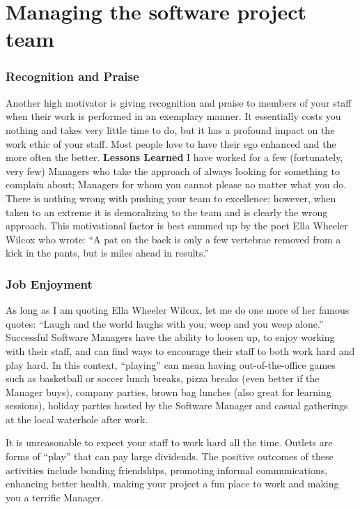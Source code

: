 \documentclass{book}
\begin{document}
\setcounter{chapter}{6}
\chapter{Managing the software project team}
\setcounter{section}{4}
\setcounter{subsection}{3}
\subsection{Recognition and Praise}

Another high motivator is giving recognition and praise to
members of your staff when their work is performed in an
exemplary manner. It essentially costs you nothing and takes
very little time to do, but it has a profound impact on the
work ethic of your staff. Most people love to have their ego
enhanced and the more often the better.
\textbf{Lessons Learned} I have worked for a few
(fortunately, very few) Managers who take
the approach of always looking for something
to complain about; Managers for whom you
cannot please no matter what you do. There is
nothing wrong with pushing your team to
excellence; however, when taken to an extreme
it is demoralizing to the team and is clearly the
wrong approach. This motivational factor is best
summed up by the poet Ella Wheeler Wilcox
who wrote: “A pat on the back is only a few vertebrae
removed from a kick in the pants, but is miles
ahead in results.”

\subsection{Job Enjoyment}

As long as I am quoting Ella Wheeler Wilcox, let me do one
more of her famous quotes: “Laugh and the world laughs
with you; weep and you weep alone.” Successful Software
Managers have the ability to loosen up, to enjoy working
with their staff, and can find ways to encourage their staff to
both work hard and play hard. In this context, “playing” can
mean having out-of-the-office games such as basketball or
soccer lunch breaks, pizza breaks (even better if the Manager
buys), company parties, brown bag lunches (also great for
learning sessions), holiday parties hosted by the Software
Manager and casual gatherings at the local waterhole after
work.

It is unreasonable to expect your staff to work hard
all the time. Outlets are forms of “play” that can pay large
dividends. The positive outcomes of these activities include
bonding friendships, promoting informal communications,
enhancing better health, making your project a fun place to
work and making you a terrific Manager.
\end{document}
